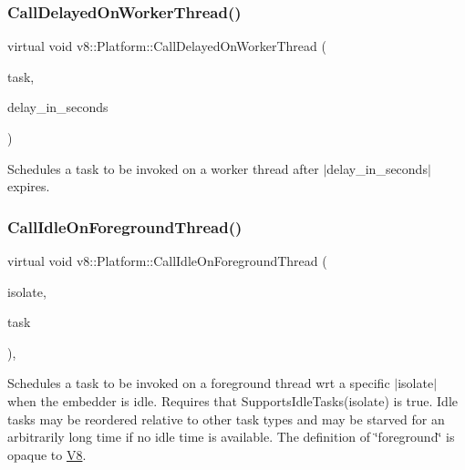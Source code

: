 \subsubsection{\texorpdfstring{Call\+Delayed\+On\+Worker\+Thread()}{CallDelayedOnWorkerThread()}}
{\footnotesize\ttfamily virtual void v8\+::\+Platform\+::\+Call\+Delayed\+On\+Worker\+Thread (\begin{DoxyParamCaption}\item[{std\+::unique\+\_\+ptr$<$ \mbox{\hyperlink{classv8_1_1Task}{Task}} $>$}]{task,  }\item[{double}]{delay\+\_\+in\+\_\+seconds }\end{DoxyParamCaption})\hspace{0.3cm}{\ttfamily [pure virtual]}}

Schedules a task to be invoked on a worker thread after $\vert$delay\+\_\+in\+\_\+seconds$\vert$ expires. \mbox{\label{classv8_1_1Platform_ae495999016432391f04d323452084b12}} 
\subsubsection{\texorpdfstring{Call\+Idle\+On\+Foreground\+Thread()}{CallIdleOnForegroundThread()}}
{\footnotesize\ttfamily virtual void v8\+::\+Platform\+::\+Call\+Idle\+On\+Foreground\+Thread (\begin{DoxyParamCaption}\item[{\mbox{\hyperlink{classv8_1_1Isolate}{Isolate}} $\ast$}]{isolate,  }\item[{\mbox{\hyperlink{classv8_1_1IdleTask}{Idle\+Task}} $\ast$}]{task }\end{DoxyParamCaption})\hspace{0.3cm}{\ttfamily [inline]}, {\ttfamily [virtual]}}

Schedules a task to be invoked on a foreground thread wrt a specific $\vert$isolate$\vert$ when the embedder is idle. Requires that Supports\+Idle\+Tasks(isolate) is true. Idle tasks may be reordered relative to other task types and may be starved for an arbitrarily long time if no idle time is available. The definition of \char`\"{}foreground\char`\"{} is opaque to \mbox{\hyperlink{classv8_1_1V8}{V8}}. \mbox{\label{classv8_1_1Platform_a8fa13959f919d1d3ff170bceea939915}} 
